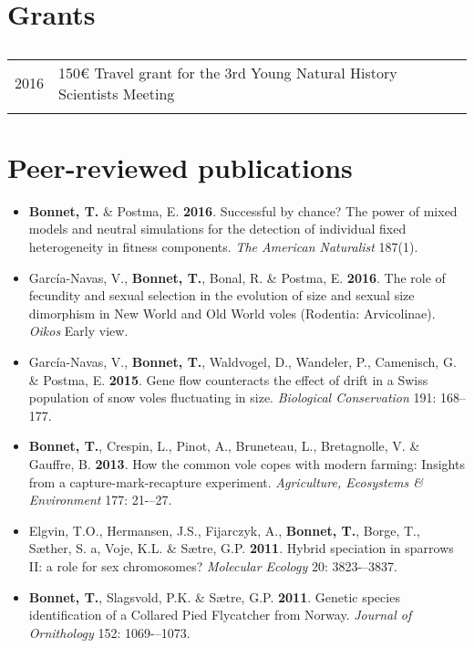 \documentclass[a4paper,oneside,10pt]{article} %
\begin{document}
\section*{Grants}
\subsection*{}
\begin{tabular}{p{4cm}|p{11cm}}
\hfill \textsc{2016} & 150€ Travel grant for the 3rd Young Natural History Scientists Meeting\\
\multicolumn{2}{c}{} \\
\end{tabular}

\vspace{20pt}
\section*{Peer-reviewed publications}
\vspace{10pt}
\begin{itemize}
\item \textbf{Bonnet, T.} \& Postma, E. \textbf{2016}. Successful by chance? The power of mixed models and neutral simulations for the detection of individual fixed heterogeneity in fitness components. \textit{The American Naturalist} 187(1).
\item Garc\'{i}a-Navas, V., \textbf{Bonnet, T.}, Bonal, R. \& Postma, E. \textbf{2016}. The role of fecundity and sexual selection in the evolution of size and sexual size dimorphism in New World and Old World voles (Rodentia: Arvicolinae). \textit{Oikos} Early view.
\item Garc\'{i}a-Navas, V., \textbf{Bonnet, T.}, Waldvogel, D., Wandeler, P., Camenisch, G. \& Postma, E. \textbf{2015}. Gene flow counteracts the effect of drift in a Swiss population of snow voles fluctuating in size. \textit{Biological Conservation} 191: 168--177.
\item \textbf{Bonnet, T.}, Crespin, L., Pinot, A., Bruneteau, L., Bretagnolle, V. \& Gauffre, B. \textbf{2013}. How the common vole copes with modern farming: Insights from a capture-mark-recapture experiment. \textit{Agriculture, Ecosystems \& Environment} 177: 21-–27.
\item Elgvin, T.O., Hermansen, J.S., Fijarczyk, A., \textbf{Bonnet, T.}, Borge, T., S{\ae}ther, S. a, Voje, K.L. \& S{\ae}tre, G.P. \textbf{2011}. Hybrid speciation in sparrows II: a role for sex chromosomes? \textit{Molecular Ecology} 20: 3823-–3837.
\item \textbf{Bonnet, T.}, Slagsvold, P.K. \& S{\ae}tre, G.P. \textbf{2011}. Genetic species identification of a Collared Pied Flycatcher from Norway. \textit{Journal of Ornithology} 152: 1069-–1073.
\end{itemize}
\end{document}
